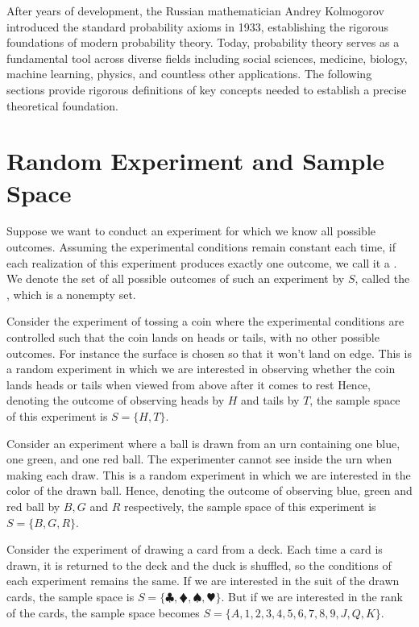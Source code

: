 After years of development, the Russian mathematician Andrey Kolmogorov introduced the standard probability axioms in 1933, establishing the rigorous foundations of modern probability theory.
Today, probability theory serves as a fundamental tool across diverse fields including social sciences, medicine, biology, machine learning, physics, and countless other applications.
The following sections provide rigorous definitions of key concepts needed to establish a precise theoretical foundation.

\section{Random Experiment and Sample Space}

Suppose we want to conduct an experiment for which we know all possible outcomes.
Assuming the experimental conditions remain constant each time, if each realization of this experiment produces exactly one outcome, we call it a .
We denote the set of all possible outcomes of such an experiment by \( S \), called the , which is a nonempty set.
\begin{exmp}\label{exmp:coin_toss}
	Consider the experiment of tossing a coin where the experimental conditions are controlled such that the coin lands on heads or tails, with no other possible outcomes.
	For instance the surface is chosen so that it won't land on edge.
	This is a random experiment in which we are interested in observing whether the coin lands heads or tails when viewed from above after it comes to rest
	Hence, denoting the outcome of observing heads by \( H \) and tails by \( T \), the sample space of this experiment is \( S = \{ H, T \} \).
\end{exmp}
\begin{exmp}\label{exmp:three_balls_urn}
	Consider an experiment where a ball is drawn from an urn containing one blue, one green, and one red ball.
	The experimenter cannot see inside the urn when making each draw.
	This is a random experiment in which we are interested in the color of the drawn ball.
	Hence, denoting the outcome of observing blue, green and red ball by \( B, G \) and \( R \) respectively, the sample space of this experiment is \( S = \{ B, G, R \} \).
\end{exmp}
\begin{exmp}\label{exmp:playing_cards}
	Consider the experiment of drawing a card from a deck.
	Each time a card is drawn, it is returned to the deck and the duck is shuffled, so the conditions of each experiment remains the same.
	If we are interested in the suit of the drawn cards, the sample space is \( S = \{ \clubsuit, \vardiamondsuit, \spadesuit, \varheartsuit \} \).
	But if we are interested in the rank of the cards, the sample space becomes \( S = \{ A, 1, 2, 3, 4, 5, 6, 7, 8, 9, J, Q, K \} \).
\end{exmp}

